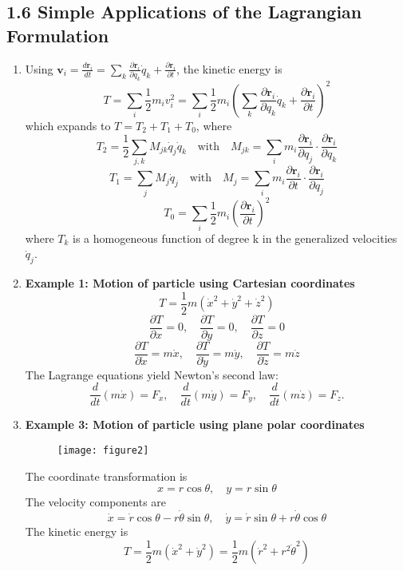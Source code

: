 \documentclass[12pt,a4paper]{article}
\theoremstyle{definition}
\theoremstyle{remark}
\renewcommand{\vec}[1]{\mathbf{#1}}
\begin{document}
	\subsection{1.6 Simple Applications of the Lagrangian Formulation}
	\begin{enumerate}
		\item Using $\vec{v}_i = \frac{d\vec{r}_i}{dt} = \sum_k \frac{\partial \vec{r}_i}{\partial q_k} \dot{q}_k + \frac{\partial \vec{r}_i}{\partial t}$, the kinetic energy is
		$$ T = \sum_i \frac{1}{2} m_i v_i^2 = \sum_i \frac{1}{2} m_i \left(\sum_k \frac{\partial \vec{r}_i}{\partial q_k} \dot{q}_k + \frac{\partial \vec{r}_i}{\partial t}\right)^2 $$
		which expands to $T = T_2 + T_1 + T_0$, where
		$$ T_2 = \frac{1}{2} \sum_{j,k} M_{jk} \dot{q}_j \dot{q}_k \quad \text{with} \quad M_{jk} = \sum_i m_i \frac{\partial \vec{r}_i}{\partial q_j} \cdot \frac{\partial \vec{r}_i}{\partial q_k} $$
		$$ T_1 = \sum_j M_j \dot{q}_j \quad \text{with} \quad M_j = \sum_i m_i \frac{\partial \vec{r}_i}{\partial t} \cdot \frac{\partial \vec{r}_i}{\partial q_j} $$
		$$ T_0 = \sum_i \frac{1}{2} m_i \left(\frac{\partial \vec{r}_i}{\partial t}\right)^2 $$
		where $T_k$ is a homogeneous function of degree k in the generalized velocities $\dot{q}_j$.
		
		\item \textbf{Example 1: Motion of particle using Cartesian coordinates}
		$$ T = \frac{1}{2}m(\dot{x}^2 + \dot{y}^2 + \dot{z}^2) $$
		$$ \frac{\partial T}{\partial x} = 0, \quad \frac{\partial T}{\partial y} = 0, \quad \frac{\partial T}{\partial z} = 0 $$
		$$ \frac{\partial T}{\partial \dot{x}} = m\dot{x}, \quad \frac{\partial T}{\partial \dot{y}} = m\dot{y}, \quad \frac{\partial T}{\partial \dot{z}} = m\dot{z} $$
		The Lagrange equations yield Newton's second law:
		$$ \frac{d}{dt}(m\dot{x}) = F_x, \quad \frac{d}{dt}(m\dot{y}) = F_y, \quad \frac{d}{dt}(m\dot{z}) = F_z. $$
		
    	
		
		\item \textbf{Example 3: Motion of particle using plane polar coordinates}
		
		
		\begin{figure}[h]
			\centering
			\texttt{[image: figure2]}
			\caption{}
			\label{fig:figure2page26}
		\end{figure}
		
		The coordinate transformation is
		$$ x = r\cos\theta, \quad y = r\sin\theta $$
		The velocity components are
		$$ \dot{x} = \dot{r}\cos\theta - r\dot{\theta}\sin\theta, \quad \dot{y} = \dot{r}\sin\theta + r\dot{\theta}\cos\theta $$
		The kinetic energy is
		$$ T = \frac{1}{2}m(\dot{x}^2+\dot{y}^2) = \frac{1}{2}m(\dot{r}^2 + r^2\dot{\theta}^2) $$
		

\end{enumerate}
\end{document}
